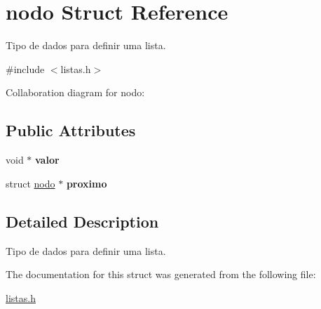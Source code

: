\hypertarget{structnodo}{}\section{nodo Struct Reference}
\label{structnodo}


Tipo de dados para definir uma lista.  




{\ttfamily \#include $<$listas.\+h$>$}



Collaboration diagram for nodo\+:
\subsection*{Public Attributes}
\begin{DoxyCompactItemize}
\item 
\mbox{\label{structnodo_ab63adcdb83ea1fdcf4fa10f3cafc4a6a}} 
void $\ast$ {\bfseries valor}
\item 
\mbox{\label{structnodo_aaaabdcb6641ddcdac8990402242b154a}} 
struct \hyperlink{structnodo}{nodo} $\ast$ {\bfseries proximo}
\end{DoxyCompactItemize}


\subsection{Detailed Description}
Tipo de dados para definir uma lista. 

The documentation for this struct was generated from the following file\+:\begin{DoxyCompactItemize}
\item 
\hyperlink{listas_8h}{listas.\+h}\end{DoxyCompactItemize}
